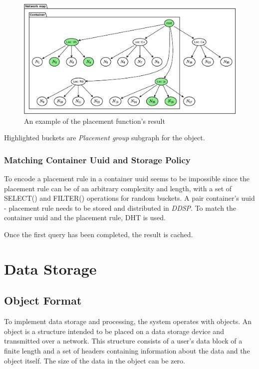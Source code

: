 \documentclass[a4paper, 11pt]{article}
\begin{document}
\begin{figure}[!h]
\centering
\includegraphics[scale=.55]{pic/uml_8_n_map_4.eps}
\centering
\caption{ An example of the placement function’s result}
\end{figure}

Highlighted buckets are \textit{Placement group} subgraph for the object.

\subsubsection{Matching Container Uuid and Storage Policy}

To encode a placement rule in a container uuid seems to be impossible since
the placement rule can be of an arbitrary complexity and length, with a set of
SELECT() and FILTER() operations for random buckets. A pair container's uuid -
placement rule needs to be stored and distributed in \textit{DDSP}. 
To match the container uuid and the placement rule, DHT is used.

Once the first query has been completed, the result is cached.

\section{Data Storage}

\subsection{Object Format}

To implement data storage and processing, the system operates with objects. An
object is a structure intended to be placed on a data storage device and
transmitted over a network. This structure consists of a user's data block of a
finite length and a set of headers containing information about the data and the
object itself. The size of the data in the object can be zero.
\end{document}
